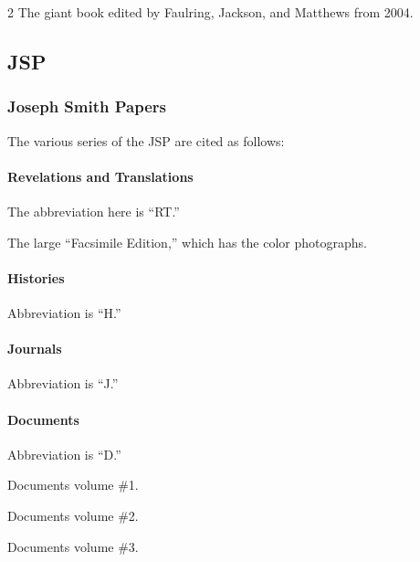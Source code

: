 \begin{multicols}{2}
			The giant book edited by Faulring, Jackson, and Matthews from 2004.
			
	\subsection*{JSP}

		\subsubsection*{Joseph Smith Papers}
		
			The various series of the JSP are cited as follows:
			
			\paragraph*{Revelations and Translations}

				The abbreviation here is ``RT.''
			
				\begin{compactitem}
					\item[JSP-RT-FE] The large ``Facsimile Edition,'' which has the color photographs.
				\end{compactitem}
			
			\paragraph*{Histories}
			
				Abbreviation is ``H.''
			
			\paragraph*{Journals}
			
				Abbreviation is ``J.''
			
			\paragraph*{Documents}
			
				Abbreviation is ``D.''
				
				\begin{compactitem}
					\item[JSP-D1] Documents volume \#1.
					\item[JSP-D2] Documents volume \#2.
					\item[JSP-D3] Documents volume \#3.
				\end{compactitem}
				

\end{multicols}
